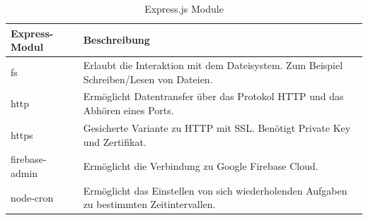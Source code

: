 \begin{table}[h]
\caption{Express.js Module}
\begin{center}
    \begin{tabular}{l p{8cm}}
	 \toprule
    \textbf{Express-Modul} & \textbf{Beschreibung} \\ 
    \midrule
    fs & Erlaubt die Interaktion mit dem Dateisystem.\newline
	Zum Beispiel Schreiben/Lesen von Dateien.\\
    
    http & Ermöglicht Datentransfer über das Protokol HTTP und das Abhören eines Ports.  \\
    
	https & Gesicherte Variante zu HTTP mit SSL.\newline
	Benötigt Private Key und Zertifikat.  \\
    firebase-admin & Ermöglicht die Verbindung zu Google Firebase Cloud. \\ 
        
    node-cron & Ermöglicht das Einstellen von sich wiederholenden Aufgaben zu bestimmten Zeitintervallen.  \\
    \bottomrule
    \end{tabular}
\end{center}
\end{table}
